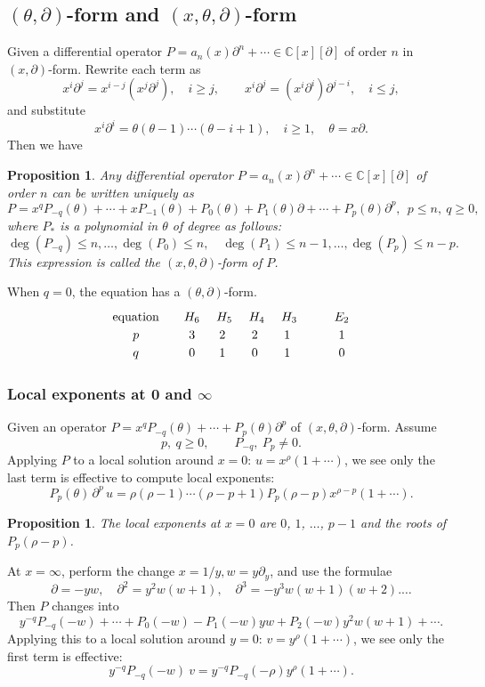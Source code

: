 \documentclass[a4paper,12pt]{article}
\newtheorem{prp}[thm]{Proposition}
\theoremstyle{definition}
\theoremstyle{remark}
\numberwithin{equation}{section} %
\begin{document}
   \subsection{$(\theta,\partial)$-form and $(x,\theta,\partial)$-form}\label{Genxz}
Given a differential operator $P=a_n(x)\partial^n+\cdots\in\mathbb{C}[x][\partial]$
of order $n$ in $(x,\partial)$-form.
Rewrite each term as
  $$x^i\partial^j=x^{i-j}(x^j\partial^j),\quad i\ge j,\qquad
x^i\partial^j=(x^i\partial^i)\partial^{j-i},\quad i\le j,
    $$
and substitute 
  $$x^i\partial^i=\theta(\theta-1)\cdots(\theta-i+1),\quad i\ge1,\quad \theta=x\partial.$$
Then we have
\begin{prp}\label{xzdxexpression}
    Any differential operator $P=a_n(x)\partial^n + \cdots\in\mathbb{C}[x][\partial]$  %
  of order $n$ can be written uniquely as
  $$P=x^qP_{-q}(\theta)+\cdots+xP_{-1}(\theta)+P_0(\theta)+P_1(\theta)\partial+\cdots+P_p(\theta)\partial^p,\ \ p\le n,\ q\ge0,$$
  where $P_*$ is a polynomial in $\theta$ of degree as follows:
  $$\deg (P_{-q})\le n, \dots, \deg (P_0)\le n,\quad \deg(P_1)
    \le n-1,\dots, \deg (P_p)\le n-p.$$
This expression is called the $(x,\theta,\partial)$-{\rm form} of $P$.
\end{prp}
When $q=0$, the equation has a $(\theta,\partial)$-form.
\[ \def\arraystretch{1.2}
   \begin{array}{ccccccc}
     {\rm equation}&& H_{6}&\ H_{5}&\ H_{4}&\ H_{3}&\qquad E_2 \\
     p&&3&2&2&1&\qquad1\\
     q&&0&1&0&1&\qquad0
     \end{array}\]
             
\subsubsection{Local exponents at 0 and $\infty$}\label{GenxzLoc}
Given an operator $P=x^qP_{-q}(\theta)+\cdots+P_p(\theta)\partial^p$
of $(x,\theta,\partial)$-form. Assume
$$p,\ q\ge0, \qquad P_{-q},\ P_p\not=0.$$
Applying $P$ to a local solution
around $x=0$: $u=x^\rho(1+\cdots)$,
we see only the last term is effective to compute local exponents:
$$P_p(\theta)\,\partial^p\, u=\rho(\rho-1)\cdots(\rho-p+1)P_p(\rho-p)x^{\rho-p}(1+\cdots).$$

\begin{prp}\label{localat0}The local exponents at $x=0$ are
      $0$, $1$, $\dots$, $p-1$ and the roots of $P_p(\rho-p)$.
\end{prp}
At $x=\infty$, perform the change $x=1/y, w=y\partial_{y}$,
and use the formulae
$$\partial=-yw,\quad \partial^2=y^2w(w+1),
\quad \partial^3=-y^3w(w+1)(w+2).\dots
$$
Then $P$ changes into
$$y^{-q}P_{-q}(-w)+\cdots+P_0(-w)-P_1(-w)yw+P_2(-w)y^2w(w+1)+\cdots.
$$
Applying this to a local solution around $y=0$: $v=y^\rho(1+\cdots)$,
we see only the first term is effective:
$$y^{-q}P_{-q}(-w)\ v=y^{-q}P_{-q}(-\rho)y^{\rho}(1+\cdots).
$$
\end{document}
